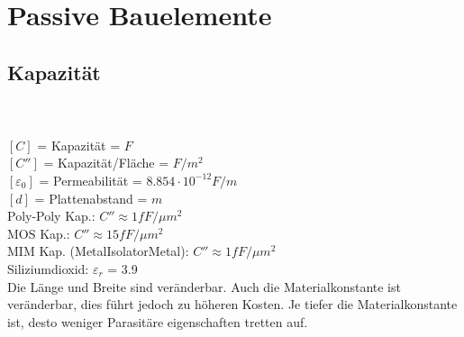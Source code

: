 \section{Passive Bauelemente}
\begin{minipage}{0.5\linewidth}
\subsection{Kapazität}
\vspace{5pt}\\
\vspace{5pt}\\ 
$[C]$ = Kapazität = $F$ \\
$[C'']$ = Kapazität/Fläche = $F/m^2$ \\
$[\varepsilon_0]$ = Permeabilität = $8.854\cdot 10^{-12}F/m$ \\
$[d]$ = Plattenabstand = $m$ \\
Poly-Poly Kap.: $C'' \approx 1fF/\mu m^2$\\
MOS Kap.: $C'' \approx 15fF/\mu m^2$  \\
MIM Kap. (MetalIsolatorMetal): $C'' \approx 1fF/\mu m^2$  \\
Siliziumdioxid: $\varepsilon_r$ = 3.9\\
Die Länge und Breite sind veränderbar. Auch die Materialkonstante ist veränderbar, dies führt jedoch zu höheren Kosten. Je tiefer die Materialkonstante ist, desto weniger Parasitäre eigenschaften tretten auf.
\end{minipage}%
